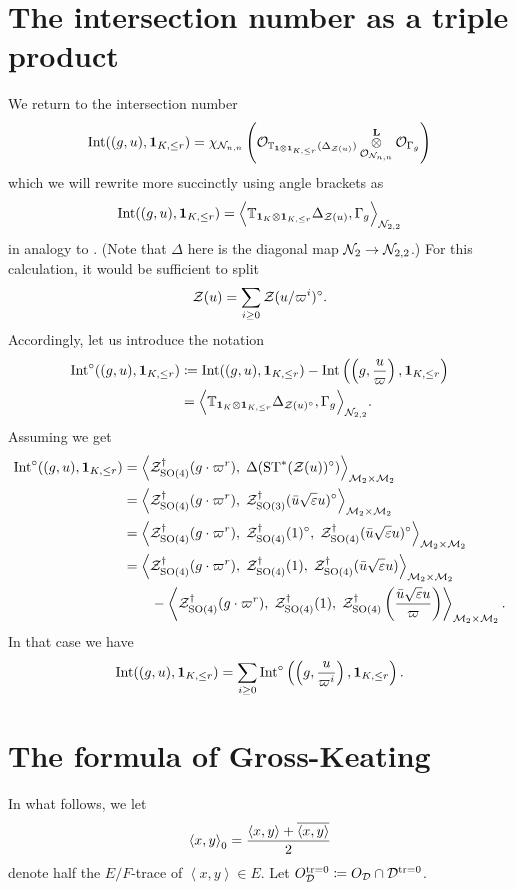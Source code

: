 \section{The intersection number as a triple product}
We return to the intersection number
\[ \operatorname{Int}((g,u), \mathbf{1}_{K, \le r}) = \chi_{\mathcal N_{n,n}} \left(
      \mathcal{O}_{\mathbb T_{\mathbf{1} \otimes \mathbf{1}_{K, \le r}}(\Delta_{\mathcal Z(u)})}
      \mathop{\otimes}^{\mathbf{L}}_{\mathcal{O}_{\mathcal N_{n,n}}} \mathcal{O}_{\Gamma_g} \right) \]
which we will rewrite more succinctly using angle brackets as
\[ \operatorname{Int}((g,u), \mathbf{1}_{K, \le r}) = \Big\langle
  \mathbb{T}_{\mathbf{1}_K \otimes \mathbf{1}_{K, \le r}}
  \Delta_{\mathcal Z(u)}, \Gamma_g \Big\rangle_{\mathcal N_{2,2}} \]
in analogy to \cite[\S6.1]{ref:AFLspherical}.
(Note that $\Delta$ here is the diagonal map $\mathcal N_2 \to \mathcal N_{2,2}$.)
For this calculation, it would be sufficient to split
\[ \mathcal Z(u) = \sum_{i \ge 0} \mathcal Z(u/\varpi^i)^\circ. \]
Accordingly, let us introduce the notation
\begin{align*}
  \operatorname{Int}^\circ((g,u), \mathbf{1}_{K, \le r})
  &\coloneqq \operatorname{Int}((g,u), \mathbf{1}_{K, \le r}) - \operatorname{Int}\left( \left( g, \frac{u}{\varpi} \right), \mathbf{1}_{K, \le r} \right) \\
  &= \Big\langle \mathbb{T}_{\mathbf{1}_K \otimes \mathbf{1}_{K, \le r}}
    \Delta_{\mathcal Z(u)^\circ}, \Gamma_g \Big\rangle_{\mathcal N_{2,2}}.
\end{align*}
Assuming  we get
\begin{align*}
  \operatorname{Int}^\circ((g,u), \mathbf{1}_{K, \le r})
  &= \left< \mathcal Z^{\dagger}_{\operatorname{SO}(4)}(g \cdot \varpi^r), \; \Delta(\operatorname{ST}^\ast(\mathcal Z(u))^\circ) \right>_{\mathcal M_2 \times \mathcal M_2} \\
  &= \left< \mathcal Z^{\dagger}_{\operatorname{SO}(4)}(g \cdot \varpi^r), \; \mathcal Z^{\dagger}_{\operatorname{SO}(3)}(\bar u \sqrt{\varepsilon} u)^\circ \right>_{\mathcal M_2 \times \mathcal M_2} \\
  &= \left< \mathcal Z^{\dagger}_{\operatorname{SO}(4)}(g \cdot \varpi^r), \; \mathcal Z^{\dagger}_{\operatorname{SO}(4)}(1)^\circ, \; \mathcal Z^{\dagger}_{\operatorname{SO}(4)}(\bar u \sqrt{\varepsilon} u)^\circ \right>_{\mathcal M_2 \times \mathcal M_2} \\
  &= \left< \mathcal Z^{\dagger}_{\operatorname{SO}(4)}(g \cdot \varpi^r), \; \mathcal Z^{\dagger}_{\operatorname{SO}(4)}(1), \; \mathcal Z^{\dagger}_{\operatorname{SO}(4)}(\bar u \sqrt{\varepsilon} u) \right>_{\mathcal M_2 \times \mathcal M_2} \\
  &\qquad- \left< \mathcal Z^{\dagger}_{\operatorname{SO}(4)}(g \cdot \varpi^r), \; \mathcal Z^{\dagger}_{\operatorname{SO}(4)}(1), \; \mathcal Z^{\dagger}_{\operatorname{SO}(4)}\left( \frac{\bar u \sqrt{\varepsilon} u}{\varpi} \right) \right>_{\mathcal M_2 \times \mathcal M_2}.
\end{align*}
In that case we have
\begin{equation}
  \operatorname{Int}((g,u), \mathbf{1}_{K, \le r})
  = \sum_{i \ge 0} \operatorname{Int}^\circ\left( \left( g, \frac{u}{\varpi^i} \right), \mathbf{1}_{K, \le r} \right).
  \label{eq:int_to_int_circ}
\end{equation}

\section{The formula of Gross-Keating}
\label{sec:GK}
In what follows, we let
\[ \left\langle x, y \right\rangle _0
  = \frac{\left\langle x,y \right\rangle + \overline{\left\langle x,y \right\rangle}}{2} \]
denote half the $E/F$-trace of $\left\langle x,y \right\rangle \in E$.
Let $O_\mathcal D^{\operatorname{tr} = 0} \coloneqq O_\mathcal D \cap \mathcal D^{\operatorname{tr} = 0}$.

